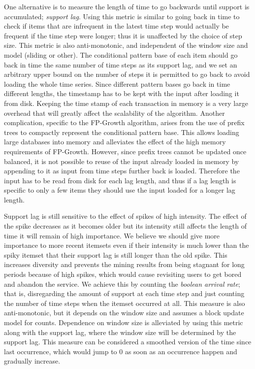 \documentclass[11pt]{llncs} %
\begin{document}
One alternative is to measure the length of time to go backwards until support is accumulated; \emph{support lag}. Using this metric is similar to going back in time to check if items that are infrequent in the latest time step would actually be frequent if the time step were longer; thus it is unaffected by the choice of step size. This metric is also anti-monotonic, and independent of the window size and model (sliding or other). The conditional pattern base of each item should go back in time the same number of time steps as its support lag, and we set an arbitrary upper bound on the number of steps it is permitted to go back to avoid loading the whole time series. Since different pattern bases go back in time different lengths,  the timestamp has to be kept with the input after loading it from disk. Keeping the time stamp of each transaction in memory is a very large overhead that will greatly affect the scalability of the algorithm. Another complication, specific to the FP-Growth algorithm, arises from the use of prefix trees to compactly represent the conditional pattern base. This allows loading large databases into memory and alleviates the effect of the high memory requirements of FP-Growth. However, since prefix trees cannot be updated once balanced, it is not possible to reuse of the input already loaded in memory by appending to it as input from time steps further back is loaded. Therefore the input has to be read from disk for each lag length, and thus if a lag length is specific to only a few items they should use the input loaded for a longer lag length.

Support lag is still sensitive to the effect of spikes of high intensity. The effect of the spike decreases as it becomes older but its intensity still affects the length of time it will remain of high importance. We believe we should give more importance to more recent itemsets even if their intensity is much lower than the spiky itemset that their support lag is still longer than the old spike. This increases diversity and prevents the mining results from being stagnant for long periods because of high spikes, which would cause revisiting users to get bored and abandon the service. We achieve this by counting the \emph{boolean arrival rate}; that is, disregarding the amount of support at each time step and just counting the number of time steps when the itemset occurred at all. This measure is also anti-monotonic, but it depends on the window size and assumes a block update model for counts. Dependence on window size is alleviated by using this metric along with the support lag, where the window size will be determined by the support lag. This measure can be considered a smoothed version of the time since last occurrence, which would jump to 0 as soon as an occurrence happen and gradually increase.
\end{document}
